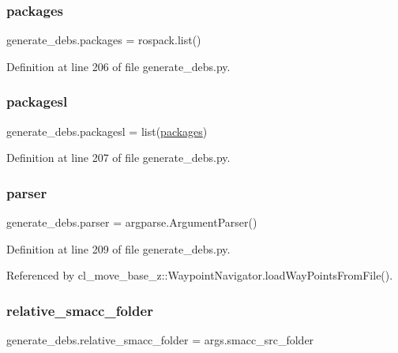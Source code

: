 \subsubsection{\texorpdfstring{packages}{packages}}
{\footnotesize\ttfamily generate\+\_\+debs.\+packages = rospack.\+list()}



Definition at line 206 of file generate\+\_\+debs.\+py.

\mbox{\label{namespacegenerate__debs_acac340506bc1d8ca0d0881b9c00bfea2}} 
\subsubsection{\texorpdfstring{packagesl}{packagesl}}
{\footnotesize\ttfamily generate\+\_\+debs.\+packagesl = list(\hyperlink{namespacegenerate__debs_a40d4732827c5678f3f48354238245e1d}{packages})}



Definition at line 207 of file generate\+\_\+debs.\+py.

\mbox{\label{namespacegenerate__debs_a4a9ae4bb85fc62d7973ea3d09ced6c26}} 
\subsubsection{\texorpdfstring{parser}{parser}}
{\footnotesize\ttfamily generate\+\_\+debs.\+parser = argparse.\+Argument\+Parser()}



Definition at line 209 of file generate\+\_\+debs.\+py.



Referenced by cl\+\_\+move\+\_\+base\+\_\+z\+::\+Waypoint\+Navigator.\+load\+Way\+Points\+From\+File().

\mbox{\label{namespacegenerate__debs_abf6925bd06ac1da3981fe638eefb5a61}} 
\subsubsection{\texorpdfstring{relative\+\_\+smacc\+\_\+folder}{relative\_smacc\_folder}}
{\footnotesize\ttfamily generate\+\_\+debs.\+relative\+\_\+smacc\+\_\+folder = args.\+smacc\+\_\+src\+\_\+folder}



